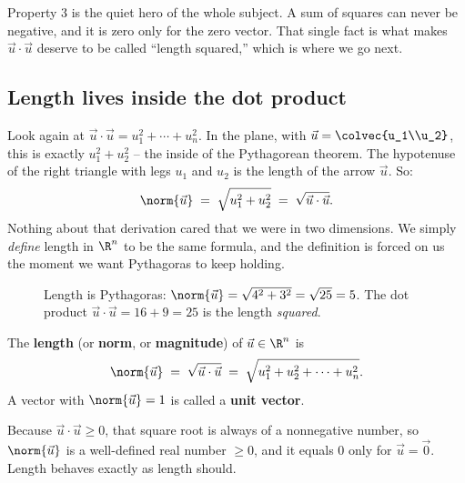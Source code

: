 Property 3 is the quiet hero of the whole subject. A sum of squares can never be
negative, and it is zero only for the zero vector. That single fact is what makes
$\vec u\cdot\vec u$ deserve to be called ``length squared,'' which is where we go
next.

\subsection{Length lives inside the dot product}

Look again at $\vec u\cdot\vec u = u_1^2 + \cdots + u_n^2$. In the plane, with
$\vec u = \colvec{u_1\\u_2}$, this is exactly $u_1^2 + u_2^2$ -- the inside of the
Pythagorean theorem. The hypotenuse of the right triangle with legs $u_1$ and
$u_2$ is the length of the arrow $\vec u$. So:
\[
  \norm{\vec u} \;=\; \sqrt{u_1^2 + u_2^2} \;=\; \sqrt{\vec u\cdot\vec u}.
\]
Nothing about that derivation cared that we were in two dimensions. We simply
\emph{define} length in $\R^n$ to be the same formula, and the definition is
forced on us the moment we want Pythagoras to keep holding.

\begin{figure}[H]
\centering
{}
\caption{Length is Pythagoras: $\norm{\vec u}=\sqrt{4^2+3^2}=\sqrt{25}=5$.
The dot product $\vec u\cdot\vec u = 16+9 = 25$ is the length \emph{squared}.}
\label{ch04:pythagoras}
\end{figure}

\begin{definition}\label{ch04:norm}
The \textbf{length} (or \textbf{norm}, or \textbf{magnitude}) of
$\vec u\in\R^n$ is
\[
  \norm{\vec u} \;=\; \sqrt{\vec u\cdot\vec u}
  \;=\; \sqrt{u_1^2 + u_2^2 + \cdots + u_n^2}.
\]
A vector with $\norm{\vec u}=1$ is called a \textbf{unit vector}.
\end{definition}

Because $\vec u\cdot\vec u \ge 0$, that square root is always of a nonnegative
number, so $\norm{\vec u}$ is a well-defined real number $\ge 0$, and it equals $0$
only for $\vec u = \vec 0$. Length behaves exactly as length should.

